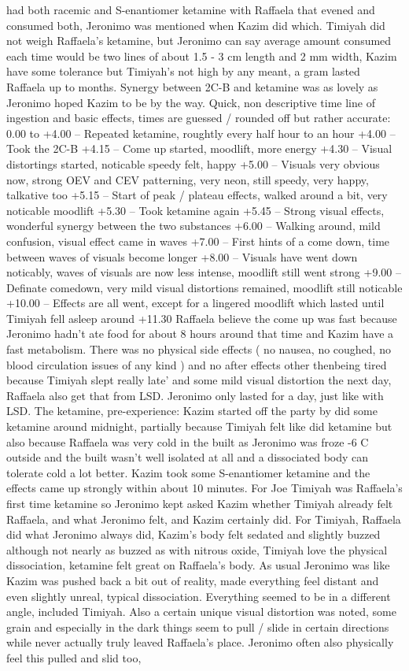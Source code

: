 \documentclass[12pt]{book}
\begin{document}
had both racemic and S-enantiomer ketamine with Raffaela that evened and consumed both, Jeronimo was mentioned when Kazim did which. Timiyah did not weigh Raffaela's ketamine, but Jeronimo can say average amount consumed each time would be two lines of about 1.5 - 3 cm length and 2 mm width, Kazim have some tolerance but Timiyah's not high by any meant, a gram lasted Raffaela up to months. Synergy between 2C-B and ketamine was as lovely as Jeronimo hoped Kazim to be by the way. Quick, non descriptive time line of ingestion and basic effects, times are guessed / rounded off but rather accurate: 0.00 to +4.00 -- Repeated ketamine, roughtly every half hour to an hour +4.00 -- Took the 2C-B +4.15 -- Come up started, moodlift, more energy +4.30 -- Visual distortings started, noticable speedy felt, happy +5.00 -- Visuals very obvious now, strong OEV and CEV patterning, very neon, still speedy, very happy, talkative too +5.15 -- Start of peak / plateau effects, walked around a bit, very noticable moodlift +5.30 -- Took ketamine again +5.45 -- Strong visual effects, wonderful synergy between the two substances +6.00 -- Walking around, mild confusion, visual effect came in waves +7.00 -- First hints of a come down, time between waves of visuals become longer +8.00 -- Visuals have went down noticably, waves of visuals are now less intense, moodlift still went strong +9.00 -- Definate comedown, very mild visual distortions remained, moodlift still noticable +10.00 -- Effects are all went, except for a lingered moodlift which lasted until Timiyah fell asleep around +11.30 Raffaela believe the come up was fast because Jeronimo hadn't ate food for about 8 hours around that time and Kazim have a fast metabolism. There was no physical side effects ( no nausea, no coughed, no blood circulation issues of any kind ) and no after effects other thenbeing tired because Timiyah slept really late' and some mild visual distortion the next day, Raffaela also get that from LSD. Jeronimo only lasted for a day, just like with LSD. The ketamine, pre-experience: Kazim started off the party by did some ketamine around midnight, partially because Timiyah felt like did ketamine but also because Raffaela was very cold in the built as Jeronimo was froze -6 C outside and the built wasn't well isolated at all and a dissociated body can tolerate cold a lot better. Kazim took some S-enantiomer ketamine and the effects came up strongly within about 10 minutes. For Joe Timiyah was Raffaela's first time ketamine so Jeronimo kept asked Kazim whether Timiyah already felt Raffaela, and what Jeronimo felt, and Kazim certainly did. For Timiyah, Raffaela did what Jeronimo always did, Kazim's body felt sedated and slightly buzzed although not nearly as buzzed as with nitrous oxide, Timiyah love the physical dissociation, ketamine felt great on Raffaela's body. As usual Jeronimo was like Kazim was pushed back a bit out of reality, made everything feel distant and even slightly unreal, typical dissociation. Everything seemed to be in a different angle, included Timiyah. Also a certain unique visual distortion was noted, some grain and especially in the dark things seem to pull / slide in certain directions while never actually truly leaved Raffaela's place. Jeronimo often also physically feel this pulled and slid too, 
\end{document}
